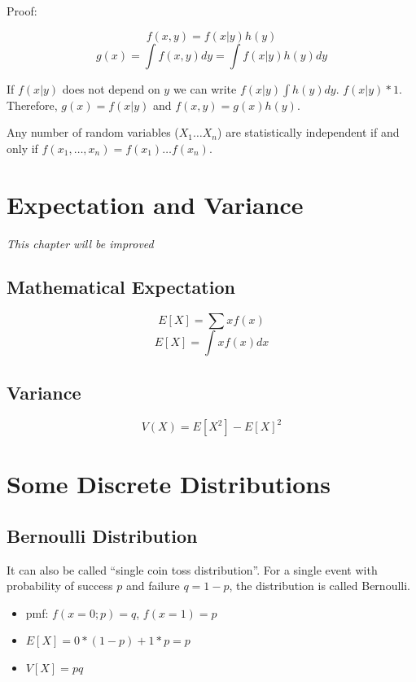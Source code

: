 \documentclass[]{book}
\theoremstyle{definition}
\theoremstyle{definition}
\theoremstyle{definition}
\theoremstyle{remark}
\begin{document}
Proof:

\[f(x,y) = f(x|y)h(y)\] \[g(x) = \int f(x,y)dy = \int f(x|y)h(y) dy \]

If \(f(x|y)\) does not depend on \(y\) we can write
\(f(x|y) \int h(y) dy\). \(f(x|y)*1\). Therefore, \(g(x)=f(x|y)\) and
\(f(x,y) = g(x)h(y)\).

Any number of random variables (\(X_1 \dots X_n\)) are statistically
independent if and only if \(f(x_1,\dots,x_n) = f(x_1)\dots f(x_n)\).

\hypertarget{expectation-and-variance}{%
\chapter{Expectation and Variance}\label{expectation-and-variance}}

\emph{This chapter will be improved}

\hypertarget{mathematical-expectation}{%
\section{Mathematical Expectation}\label{mathematical-expectation}}

\[E[X] = \sum x f(x)\] \[E[X] = \int x f(x) dx\]

\hypertarget{variance}{%
\section{Variance}\label{variance}}

\[V(X) = E[X^2] - E[X]^2 \]

\hypertarget{some-discrete-distributions}{%
\chapter{Some Discrete
Distributions}\label{some-discrete-distributions}}

\hypertarget{bernoulli-distribution}{%
\section{Bernoulli Distribution}\label{bernoulli-distribution}}

It can also be called ``single coin toss distribution''. For a single
event with probability of success \(p\) and failure \(q = 1 - p\), the
distribution is called Bernoulli.

\begin{itemize}
\item
  pmf: \(f(x = 0;p) = q\), \(f(x = 1) = p\)
\item
  \(E[X] = 0*(1-p) + 1*p = p\)
\item
  \(V[X] = pq\)
\end{itemize}
\end{document}
